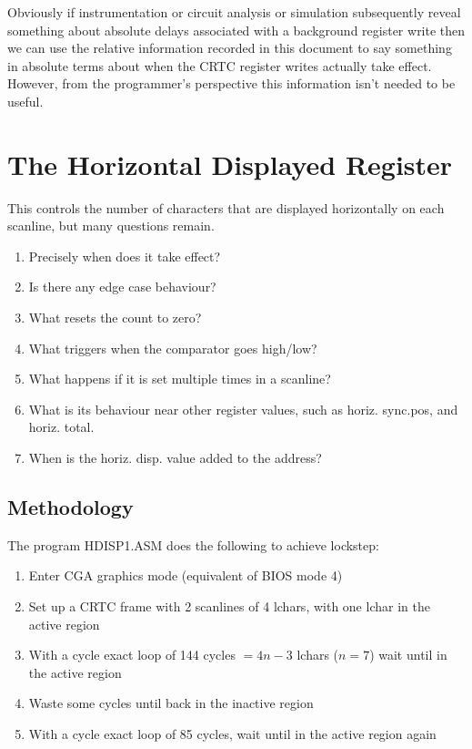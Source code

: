 \documentclass[a4paper,10pt]{amsart}
\begin{document}
Obviously if instrumentation or circuit analysis or simulation subsequently
reveal something about absolute delays associated with a background register
write then we can use the relative information recorded in this document to
say something in absolute terms about when the CRTC register writes actually
take effect. However, from the programmer's perspective this information isn't
needed to be useful.

\section{The Horizontal Displayed Register}

This controls the number of characters that are displayed horizontally on each
scanline, but many questions remain.

\begin{enumerate}
\item Precisely when does it take effect?
\item Is there any edge case behaviour?
\item What resets the count to zero?
\item What triggers when the comparator goes high/low?
\item What happens if it is set multiple times in a scanline?
\item What is its behaviour near other register values, such as horiz. sync.pos,
      and horiz. total.
\item When is the horiz. disp. value added to the address?
\end{enumerate}

\subsection{Methodology}

The program HDISP1.ASM does the following to achieve lockstep:

\begin{enumerate}
\item Enter CGA graphics mode (equivalent of BIOS mode 4)
\item Set up a CRTC frame with 2 scanlines of 4 lchars, with one lchar in the active region
\item With a cycle exact loop of 144 cycles $= 4n-3$ lchars ($n = 7$) wait until in the active region
\item Waste some cycles until back in the inactive region
\item With a cycle exact loop of 85 cycles, wait until in the active region again
\end{enumerate}
\end{document}
